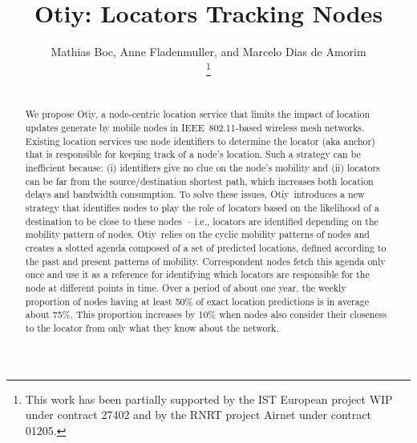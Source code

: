 \documentclass[a4paper]{sig-alternate-10pt}
\newcommand{\otiy}{{\sffamily Otiy}}
\begin{document}

\title{Otiy: Locators Tracking Nodes}

\author{
\alignauthor
     Mathias Boc, Anne Fladenmuller, and Marcelo Dias de Amorim \vspace{2mm}\\
     \thanks{This work has been partially
supported by the IST European project WIP under contract 27402 and
by the RNRT project Airnet under contract 01205.}\\
     \\
}

\maketitle

\begin{abstract}
We propose \otiy, a node-centric location service that limits the
impact of location updates generate by mobile nodes in IEEE~802.11-based
wireless mesh networks. Existing location services use node
identifiers to determine the locator (aka anchor) that is
responsible for keeping track of a node's location. Such a strategy
can be inefficient because: (i) identifiers give no clue on the
node's mobility and (ii) locators can be far from the
source/destination shortest path, which increases both location
delays and bandwidth consumption. To solve these issues, \otiy\
introduces a new strategy that identifies nodes to play the role of
locators based on the likelihood of a destination to be close to
these nodes~-- i.e., locators are identified depending on the
mobility pattern of nodes. \otiy\ relies on the cyclic mobility
patterns of nodes and creates a slotted agenda composed of a set of
predicted locations, defined according to the past and present
patterns of mobility. Correspondent nodes fetch this agenda only
once and use it as a reference for identifying which locators are
responsible for the node at different points in time. Over a period
of about one year, the weekly proportion of nodes having at least
50\% of exact location predictions is in average about 75\%. This
proportion increases by 10\% when nodes also consider their closeness
to the locator from only what they know about the network.
\end{abstract}
\end{document}
